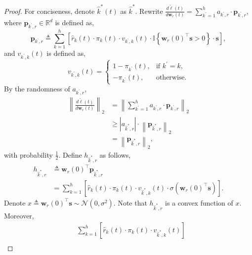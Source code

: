 \documentclass[10pt]{article}
\def\rvs{{\mathbf{s}}}
\def\rvw{{\mathbf{w}}}
\def\rvp{{\mathbf{p}}}
\def\sR{{\mathbb{R}}}
\def\sI{{\mathbb{I}}}
\def\gN{{\mathcal{N}}}
\begin{document}
\begin{proof}
	 For conciseness, denote $\hat{k}^*(t)$ as $\hat{k}^*$. Rewrite $\frac{d\tilde{\ell}\left(t\right)}{d \rvw_r(t)} = \sum\limits_{k^
	\prime=1}^{h}{ a_{k^\prime,r} \cdot \rvp_{k^\prime, r} }$, where $\rvp_{k^\prime, r} \in \sR^d$ is defined as, 
\begin{equation*}
	\rvp_{k^\prime, r} \triangleq \sum\limits_{k=1}^{h}{ \left[ \hat{r}_{k}\left(t\right) \cdot \pi_{k}(t) \cdot v_{k^\prime,k}(t) \cdot \sI\left\{ \rvw_r(0)^\top \rvs > 0 \right\} \cdot \rvs \right] },
\end{equation*}
and $v_{k^\prime,k}(t)$ is defined as,
\begin{equation*}
	v_{k^\prime,k}(t) = \begin{cases}
    1 - \pi_{k^\prime}(t), & \text{if $k^\prime = k$}, \\
    - \pi_{k^\prime}(t), & \text{otherwise}.
  \end{cases}
\end{equation*}
By the randomness of $a_{k^\prime,r}$,
\begin{equation}
\label{eq:gradient_p_lowerbound}
\begin{split}
	\left\| \frac{d\tilde{\ell}\left(t\right)}{d \rvw_r(t)} \right\|_2 &= \left\| \sum\limits_{k^
	\prime=1}^{h}{ a_{k^\prime,r} \cdot \rvp_{k^\prime, r} } \right\|_2 \\
	&\ge \left| a_{\hat{k}^*,r} \right| \cdot \left\| \rvp_{\hat{k}^*, r}\right\|_2 \\
	&= \left\| \rvp_{\hat{k}^*, r}\right\|_2,
\end{split}
\end{equation}
with probability $\frac{1}{2}$. Define $h_{\hat{k}^*,r}$ as follows,
\begin{equation}
\label{eq:h_auxiliary}
\begin{split}
	h_{\hat{k}^*,r} &\triangleq \rvw_r(0)^\top \rvp_{\hat{k}^*, r} \\
	&=  \sum\limits_{k=1}^{h}{ \left[ \hat{r}_{k}\left(t\right) \cdot \pi_{k}(t) \cdot v_{\hat{k}^*,k}(t) \cdot \sigma( \rvw_r(0)^\top \rvs ) \right] }.
\end{split}
\end{equation}
Denote $x \triangleq \rvw_r(0)^\top \rvs \sim \gN(0, \sigma^2)$. Note that $h_{\hat{k}^*,r}$ is a convex function of $x$. Moreover,
\begin{equation*}
\begin{split}
	&\sum\limits_{k=1}^{h}{ \left[ \hat{r}_{k}\left(t\right) \cdot \pi_{k}(t) \cdot v_{\hat{k}^*,k}(t) \right] } \\

\end{split}
\end{equation*}
\end{proof}
\end{document}
